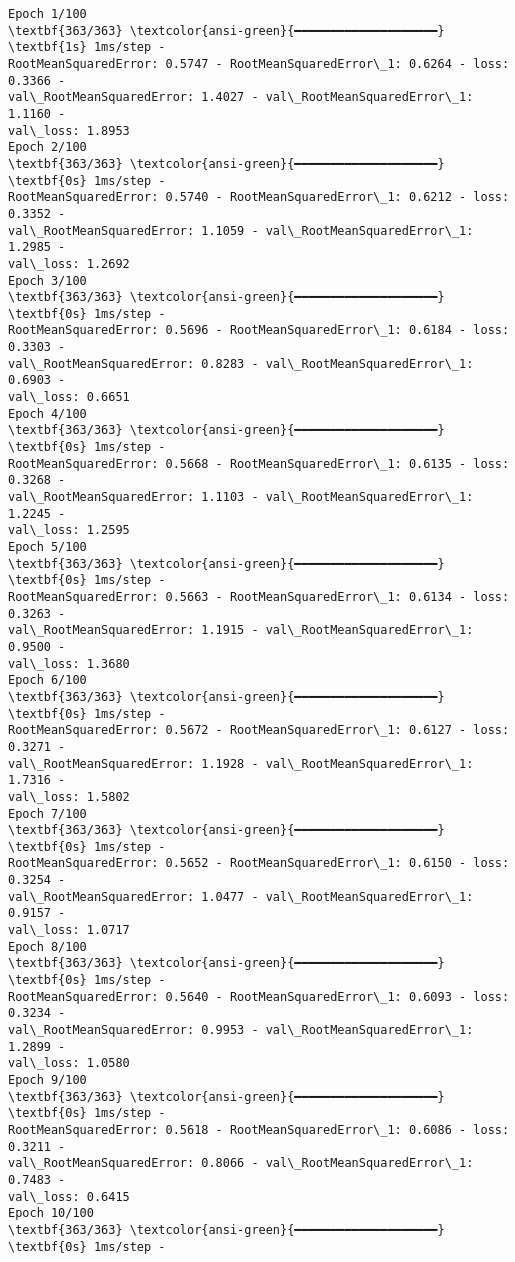\documentclass[12pt letter]{report}
\begin{document}
    \begin{Verbatim}[commandchars=\\\{\}]
Epoch 1/100
\textbf{363/363} \textcolor{ansi-green}{━━━━━━━━━━━━━━━━━━━━} \textbf{1s} 1ms/step -
RootMeanSquaredError: 0.5747 - RootMeanSquaredError\_1: 0.6264 - loss: 0.3366 -
val\_RootMeanSquaredError: 1.4027 - val\_RootMeanSquaredError\_1: 1.1160 -
val\_loss: 1.8953
Epoch 2/100
\textbf{363/363} \textcolor{ansi-green}{━━━━━━━━━━━━━━━━━━━━} \textbf{0s} 1ms/step -
RootMeanSquaredError: 0.5740 - RootMeanSquaredError\_1: 0.6212 - loss: 0.3352 -
val\_RootMeanSquaredError: 1.1059 - val\_RootMeanSquaredError\_1: 1.2985 -
val\_loss: 1.2692
Epoch 3/100
\textbf{363/363} \textcolor{ansi-green}{━━━━━━━━━━━━━━━━━━━━} \textbf{0s} 1ms/step -
RootMeanSquaredError: 0.5696 - RootMeanSquaredError\_1: 0.6184 - loss: 0.3303 -
val\_RootMeanSquaredError: 0.8283 - val\_RootMeanSquaredError\_1: 0.6903 -
val\_loss: 0.6651
Epoch 4/100
\textbf{363/363} \textcolor{ansi-green}{━━━━━━━━━━━━━━━━━━━━} \textbf{0s} 1ms/step -
RootMeanSquaredError: 0.5668 - RootMeanSquaredError\_1: 0.6135 - loss: 0.3268 -
val\_RootMeanSquaredError: 1.1103 - val\_RootMeanSquaredError\_1: 1.2245 -
val\_loss: 1.2595
Epoch 5/100
\textbf{363/363} \textcolor{ansi-green}{━━━━━━━━━━━━━━━━━━━━} \textbf{0s} 1ms/step -
RootMeanSquaredError: 0.5663 - RootMeanSquaredError\_1: 0.6134 - loss: 0.3263 -
val\_RootMeanSquaredError: 1.1915 - val\_RootMeanSquaredError\_1: 0.9500 -
val\_loss: 1.3680
Epoch 6/100
\textbf{363/363} \textcolor{ansi-green}{━━━━━━━━━━━━━━━━━━━━} \textbf{0s} 1ms/step -
RootMeanSquaredError: 0.5672 - RootMeanSquaredError\_1: 0.6127 - loss: 0.3271 -
val\_RootMeanSquaredError: 1.1928 - val\_RootMeanSquaredError\_1: 1.7316 -
val\_loss: 1.5802
Epoch 7/100
\textbf{363/363} \textcolor{ansi-green}{━━━━━━━━━━━━━━━━━━━━} \textbf{0s} 1ms/step -
RootMeanSquaredError: 0.5652 - RootMeanSquaredError\_1: 0.6150 - loss: 0.3254 -
val\_RootMeanSquaredError: 1.0477 - val\_RootMeanSquaredError\_1: 0.9157 -
val\_loss: 1.0717
Epoch 8/100
\textbf{363/363} \textcolor{ansi-green}{━━━━━━━━━━━━━━━━━━━━} \textbf{0s} 1ms/step -
RootMeanSquaredError: 0.5640 - RootMeanSquaredError\_1: 0.6093 - loss: 0.3234 -
val\_RootMeanSquaredError: 0.9953 - val\_RootMeanSquaredError\_1: 1.2899 -
val\_loss: 1.0580
Epoch 9/100
\textbf{363/363} \textcolor{ansi-green}{━━━━━━━━━━━━━━━━━━━━} \textbf{0s} 1ms/step -
RootMeanSquaredError: 0.5618 - RootMeanSquaredError\_1: 0.6086 - loss: 0.3211 -
val\_RootMeanSquaredError: 0.8066 - val\_RootMeanSquaredError\_1: 0.7483 -
val\_loss: 0.6415
Epoch 10/100
\textbf{363/363} \textcolor{ansi-green}{━━━━━━━━━━━━━━━━━━━━} \textbf{0s} 1ms/step -

\end{Verbatim}
\end{document}
